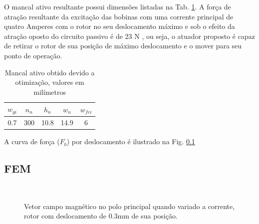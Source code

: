 O mancal ativo resultante possui dimensões listadas na Tab. \ref{tab:ativo:resultado}. A força de atração resultante da excitação das bobinas com uma corrente principal de quatro Amperes com o rotor no seu deslocamento máximo e sob o efeito da atração oposto do circuito passivo é de 23 N , ou seja, o atuador proposto é capaz de retirar o rotor de sua posição de máximo deslocamento e o mover para seu ponto de operação.

\begin{table}[ht!]
	\centering
	\begin{tabular}{c c c c c}
		 $w_{gi}$ 	& $n_n$ & $h_n$ & $w_n$ & $w_{fei}$  \\ \hline \hline
		 0.7		& 300  	& 10.8 	& 14.9	& 6
	\end{tabular} 
	\caption{Mancal ativo obtido devido a otimização, valores em milímetros}
	\label{tab:ativo:resultado} 
\end{table}

A curva de força ($F_b$) por deslocamento é ilustrado na Fig. \ref{}

\subsection{FEM}

\begin{figure}[!ht]
	\centering
		\\
	\caption{Vetor campo magnético no polo principal quando variado a corrente, rotor com deslocamento de 0.3mm de sua posição.}
	\label{fig:ativo:fem:b:polos}
\end{figure}

